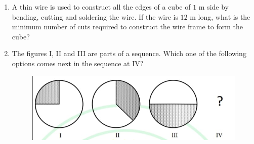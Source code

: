 \documentclass[journal,12pt,onecolumn]{article}
\theoremstyle{remark}
\begin{document}
\begin{enumerate}
\item A thin wire is used to construct all the edges of a cube of $1$ m side by bending, cutting and soldering the wire. If the wire is $12$ m long, what is the minimum number of cuts required to construct the wire frame to form the cube?

\hfill{}
\begin{enumerate}
\end{enumerate}

\item The figures  I, II and III are parts of a sequence. Which one of the following options comes next in the sequence at IV?
\begin{figure}[H]
    \centering
    \includegraphics[width=0.7\columnwidth]{figs/q5-1.jpg}
    \caption{}
    \label{fig:q5}
\end{figure}


\end{enumerate}
\end{document}
